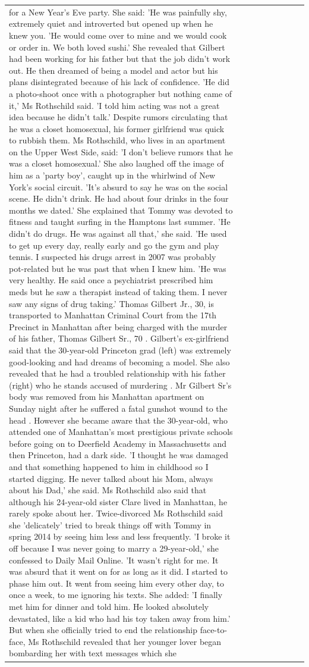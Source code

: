 \begin{table}[H]
\begin{tabular}{lllrlllll}
for a New Year’s Eve party. She said: 'He was painfully shy, extremely quiet and introverted but opened up when he knew you. 'He would come over to mine and we would cook or order in. We both loved sushi.' She revealed that Gilbert had been working for his father but that the job didn't work out. He then dreamed of being a model and actor but his plans disintegrated because of his lack of confidence. 'He did a photo-shoot once with a photographer but nothing came of it,' Ms Rothschild said. 'I told him acting was not a great idea because he didn’t talk.' Despite rumors circulating that he was a closet homosexual, his former girlfriend was quick to rubbish them. Ms Rothschild, who lives in an apartment on the Upper West Side, said: 'I don’t believe rumors that he was a closet homosexual.' She also laughed off the image of him as a 'party boy', caught up in the whirlwind of New York's social circuit. 'It’s absurd to say he was on the social scene. He didn’t drink. He had about four drinks in the four months we dated.' She explained that Tommy was devoted to fitness and taught surfing in the Hamptons last summer. 'He didn’t do drugs. He was against all that,' she said. 'He used to get up every day, really early and go the gym and play tennis. I suspected his drugs arrest in 2007 was probably pot-related but he was past that when I knew him. 'He was very healthy. He said once a psychiatrist prescribed him meds but he saw a therapist instead of taking them. I never saw any signs of drug taking.' Thomas Gilbert Jr., 30, is transported to Manhattan Criminal Court from the 17th Precinct in Manhattan after being charged with the murder of his father, Thomas Gilbert Sr., 70 . Gilbert's ex-girlfriend said that the 30-year-old Princeton grad (left) was extremely good-looking and had dreams of becoming a model. She also revealed that he had a troubled relationship with his father (right) who he stands accused of murdering . Mr Gilbert Sr's body was removed from his Manhattan apartment on Sunday night after he suffered a fatal gunshot wound to the head . However she became aware that the 30-year-old, who attended one of Manhattan's most prestigious private schools before going on to Deerfield Academy in Massachusetts and then Princeton, had a dark side. 'I thought he was damaged and that something happened to him in childhood so I started digging. He never talked about his Mom, always about his Dad,' she said. Ms Rothschild also said that although his 24-year-old sister Clare lived in Manhattan, he rarely spoke about her. Twice-divorced Ms Rothschild said she 'delicately' tried to break things off with Tommy in spring 2014 by seeing him less and less frequently. 'I broke it off because I was never going to marry a 29-year-old,' she confessed to Daily Mail Online. 'It wasn’t right for me. It was absurd that it went on for as long as it did. I started to phase him out. It went from seeing him every other day, to once a week, to me ignoring his texts. She added: 'I finally met him for dinner and told him. He looked absolutely devastated, like a kid who had his toy taken away from him.' But when she officially tried to end the relationship face-to-face, Ms Rothschild revealed that her younger lover began bombarding her with text messages which she 
\end{tabular}
\end{table}

